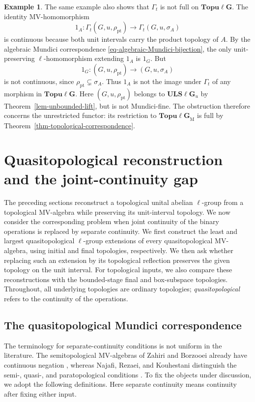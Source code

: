 \documentclass[preprint,3p]{elsarticle}
\theoremstyle{plain}
\theoremstyle{definition}
\newtheorem{exmp}[thm]{Example}
\newcommand{\Topulg}{\mathbf{Topu\ell G}}
\newcommand{\ULS}{\mathbf{ULS\ell G}_{u}}
\newcommand{\TopulgM}{\mathbf{Topu\ell G}_{\mathrm{M}}}
\numberwithin{equation}{section}
\begin{document}
\begin{exmp}
The same example also shows that $\Gamma_t$ is not full on $\Topulg$.
The identity MV-homomorphism
\[
 1_A\colon\Gamma_t(G,u,\rho_{\mathrm{pt}})
 \longrightarrow\Gamma_t(G,u,\sigma_A)
\]
is continuous because both unit intervals carry the product topology
of $A$.  By the algebraic Mundici correspondence
\eqref{eq-algebraic-Mundici-bijection}, the only
unit-preserving $\ell$-homomorphism extending $1_A$
is $1_G$.  But
\[
 1_G\colon(G,u,\rho_{\mathrm{pt}})
 \longrightarrow(G,u,\sigma_A)
\]
is not continuous, since $\rho_{\mathrm{pt}}\subsetneq\sigma_A$.
Thus $1_A$ is not the image under $\Gamma_t$ of any morphism in
$\Topulg$.  Here $(G,u,\rho_{\mathrm{pt}})$ belongs to $\ULS$ by
Theorem~\ref{lem-unbounded-lift}, but is not Mundici-fine.
The obstruction therefore concerns the unrestricted functor:
its restriction to $\TopulgM$ is full by
Theorem~\ref{thm-topological-correspondence}.
\end{exmp}

\section{Quasitopological reconstruction and the joint-continuity gap}
\label{sec-quasi-reflection}

The preceding sections reconstruct a topological unital abelian
$\ell$-group from a topological MV-algebra while preserving its
unit-interval topology.  We now consider the corresponding problem
when joint continuity of the binary operations is replaced by
separate continuity.  We first construct the least and largest
quasitopological $\ell$-group extensions of every quasitopological
MV-algebra, using initial and final topologies, respectively.
We then ask whether replacing such an extension by its topological
reflection preserves the given topology on the unit interval.
For topological inputs, we also compare these reconstructions
with the bounded-stage final and box-subspace topologies.
Throughout, all underlying topologies are ordinary topologies;
\emph{quasitopological} refers to the continuity of the operations.

\subsection{The quasitopological Mundici correspondence}
\label{sec-quasi-foundation}

The terminology for separate-continuity conditions is not uniform
in the literature.  The semitopological MV-algebras of Zahiri and
Borzooei already have continuous negation \cite{Zahiri2014}, whereas
Najafi, Rezaei, and Kouhestani distinguish the semi-, quasi-, and
paratopological conditions \cite{Najafi2017}.  To fix the objects
under discussion, we adopt the following definitions.
Here separate continuity means continuity after fixing either input.
\end{document}
